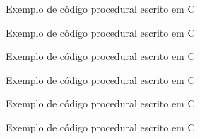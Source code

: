 \begin{frame}[fragile]{Exemplo de código procedural escrito em C}
\end{frame}

\begin{frame}[fragile]{Exemplo de código procedural escrito em C}
\end{frame}

\begin{frame}[fragile]{Exemplo de código procedural escrito em C}
\end{frame}

\begin{frame}[fragile]{Exemplo de código procedural escrito em C}
\end{frame}

\begin{frame}[fragile]{Exemplo de código procedural escrito em C}
\end{frame}

\begin{frame}[fragile]{Exemplo de código procedural escrito em C}
\end{frame}
